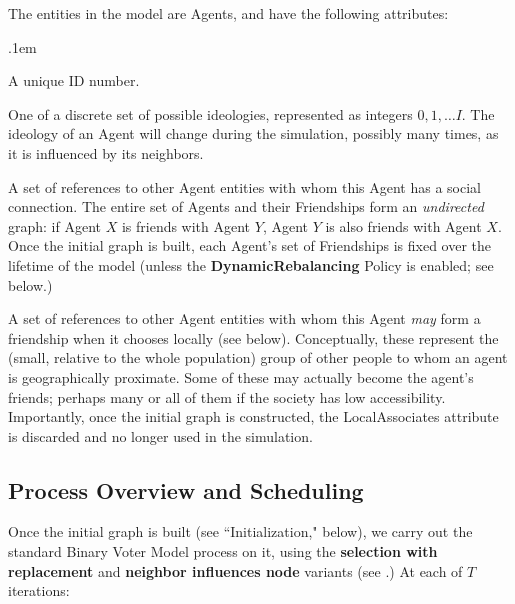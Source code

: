 The entities in the model are Agents, and have the following attributes:

\begin{description}
\itemsep.1em
\item[ID] A unique ID number.

\item[Ideology] One of a discrete set of possible ideologies, represented as
integers $0, 1, \dots I$. The ideology of an Agent will change during the
simulation, possibly many times, as it is influenced by its neighbors.

\item[Friendships] A set of references to other Agent entities with whom this
Agent has a social connection. The entire set of Agents and their Friendships
form an \textit{undirected} graph: if Agent $X$ is friends with Agent $Y$,
Agent $Y$ is also friends with Agent $X$.  Once the initial graph is built,
each Agent's set of Friendships is fixed over the lifetime of the model
(unless the \textbf{DynamicRebalancing} Policy is enabled; see below.)

\item[LocalAssociates] A set of references to other Agent entities with whom
this Agent \textit{may} form a friendship when it chooses locally (see below).
Conceptually, these represent the (small, relative to the whole population)
group of other people to whom an agent is geographically proximate. Some of
these may actually become the agent's friends; perhaps many or all of them if
the society has low accessibility. Importantly, once the initial graph is
constructed, the LocalAssociates attribute is discarded and no longer used in
the simulation.

\end{description}



\subsection{Process Overview and Scheduling}

Once the initial graph is built (see ``Initialization," below), we carry out
the standard Binary Voter Model process on it, using the \textbf{selection
with replacement} and \textbf{neighbor influences node} variants (see
\cite{davies_computational_2016}.) At each of $T$ iterations:

